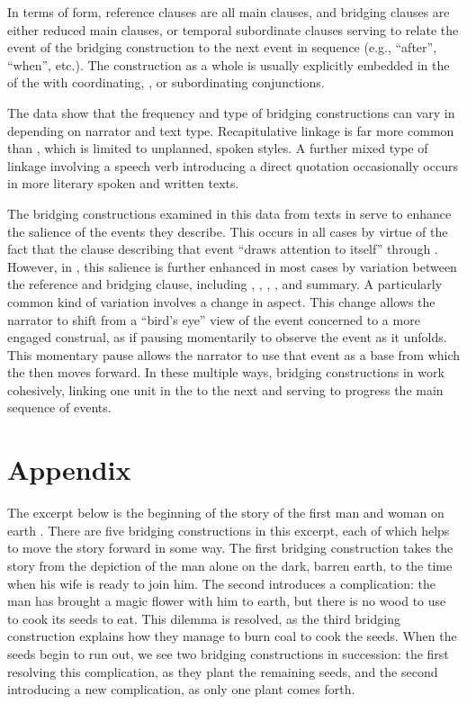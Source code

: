 \documentclass[output=paper]{LSP/langsci}
\begin{document}
In terms of form, reference clauses are all main clauses, and bridging clauses are either reduced main clauses, or temporal subordinate clauses serving to relate the event of the bridging construction to the next event in sequence (e.g., ``after'', ``when'', etc.). The construction as a whole is usually explicitly embedded in the   of the  with coordinating, , or subordinating conjunctions.

The data show that the frequency and type of bridging constructions can vary in  depending on narrator and text type. Recapitulative linkage is far more common than , which is limited to unplanned, spoken styles. A further mixed type of linkage involving a speech verb introducing a direct quotation occasionally occurs in more literary spoken and written texts.

The bridging constructions examined in this data from  texts in  serve to enhance the salience of the events they describe. This occurs in all cases by virtue of the fact that the clause describing that event ``draws attention to itself'' \citep[][210]{kress06} through . However, in , this salience is further enhanced in most cases by variation between the reference and bridging clause, including , , , , and summary. A particularly common kind of variation involves a change in aspect. This change allows the narrator to shift from a ``bird’s eye'' view of the event concerned to a more engaged construal, as if pausing momentarily to observe the event as it unfolds. This momentary pause allows the narrator to use that event as a base from which the  then moves forward. In these multiple ways, bridging constructions in  work cohesively, linking one unit in the  to the next and serving to progress the main sequence of events. 

 \section*{Appendix}
 \setcounter{equation}{0}
The excerpt below is the beginning of the story of the first man and woman on earth \citep[][3--4]{johnson92}. There are five bridging constructions in this excerpt, each of which helps to move the story forward in some way. The first bridging construction takes the story from the depiction of the man alone on the dark, barren earth, to the time when his wife is ready to join him. The second introduces a complication: the man has brought a magic flower with him to earth, but there is no wood to use to cook its seeds to eat. This dilemma is resolved, as the third bridging construction explains how they manage to burn coal to cook the seeds. When the seeds begin to run out, we see two bridging constructions in succession: the first resolving this complication, as they plant the remaining seeds, and the second introducing a new complication, as only one plant comes forth.
\end{document}

